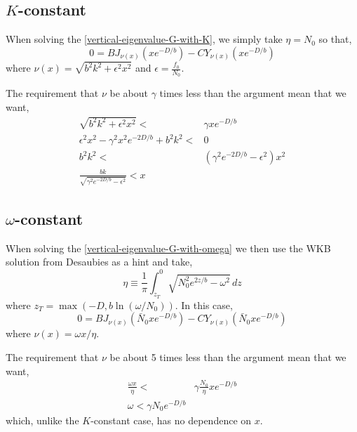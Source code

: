 \documentclass[11pt]{article}
\begin{document}
\subsection{$K$-constant}
When solving the \ref{vertical-eigenvalue-G-with-K}, we simply take $\eta = N_0$ so that,
\begin{equation}
0 =  B J_{\nu(x)} \left(  x e^{-D/b} \right) -   C Y_{\nu(x)} \left(  x e^{-D/b} \right) 
\end{equation}
where $\nu(x) = \sqrt{b^2 k^2 + \epsilon^2 x^2}$ and $\epsilon=\frac{f_0}{N_0}$.

The requirement that $\nu$ be about $\gamma$ times less than the argument mean that we want,
\begin{align}
\sqrt{b^2 k^2 + \epsilon^2 x^2} <& \gamma x e^{-D/b} \\
\epsilon^2 x^2 - \gamma^2 x^2 e^{-2 D/b} + b^2 k^2<& 0 \\
 b^2 k^2 <& \left( \gamma^2 e^{-2 D/b} - \epsilon^2\right) x^2 \\
 \frac{ b k }{ \sqrt{\gamma^2 e^{-2 D/b} - \epsilon^2} } < x
\end{align}

\subsection{$\omega$-constant}

When solving the \ref{vertical-eigenvalue-G-with-omega} we then use the WKB solution from Desaubies as a hint and take,
\begin{equation}
\eta \equiv \frac{1}{\pi} \int_{z_T}^0 \sqrt{N_0^2 e^{2 z/b}-\omega^2}\,dz
\end{equation}
where $z_T = \max\left(-D, b \ln \left(\omega/N_0\right) \right)$. In this case,
\begin{equation}
0 =  B J_{\nu(x)} \left(  \bar{N}_0 x e^{-D/b} \right) -   C Y_{\nu(x)} \left(  \bar{N}_0 x e^{-D/b} \right) 
\end{equation}
where $\nu(x) = \omega x / \eta$.

The requirement that $\nu$ be about 5 times less than the argument mean that we want,
\begin{align}
\frac{ \omega x}{ \eta } <& \gamma  \frac{N_0}{\eta} x e^{-D/b} \\
\omega < \gamma N_0 e^{-D/b}
\end{align}
which, unlike the $K$-constant case, has no dependence on $x$.
\end{document}
